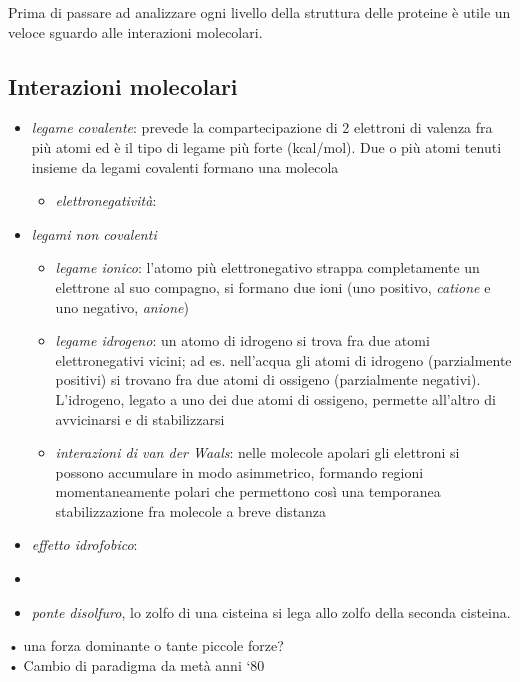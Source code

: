 Prima di passare ad analizzare ogni livello della struttura delle proteine è utile un veloce sguardo alle interazioni molecolari.

\subsection{Interazioni molecolari}

\begin{itemize}
	\item \textit{legame covalente}: prevede la compartecipazione di 2 elettroni di valenza fra più atomi ed è il tipo di legame più forte (kcal/mol). Due o più atomi tenuti insieme da legami covalenti formano una molecola
		\begin{itemize}
			\item \textit{elettronegatività}:
		\end{itemize}
		
	\item \textit{legami non covalenti}
		\begin{itemize}
			\item \textit{legame ionico}: l'atomo più elettronegativo strappa completamente un elettrone al suo compagno, si formano due ioni (uno positivo, \textit{catione} e uno negativo, \textit{anione})
			\item \textit{legame idrogeno}: un atomo di idrogeno si trova fra due atomi elettronegativi vicini; ad es. nell'acqua gli atomi di idrogeno (parzialmente positivi) si trovano fra due atomi di ossigeno (parzialmente negativi). L'idrogeno, legato a uno dei due atomi di ossigeno, permette all'altro di avvicinarsi e di stabilizzarsi
			\item \textit{interazioni di van der Waals}: nelle molecole apolari gli elettroni si possono accumulare in modo asimmetrico, formando regioni momentaneamente polari che permettono così una temporanea stabilizzazione fra molecole a breve distanza
		\end{itemize}
	\item \textit{effetto idrofobico}: 
	\item 
\end{itemize}
\begin{itemize}
	\item \textit{ponte disolfuro}, lo zolfo di una cisteina si lega allo zolfo della seconda cisteina.
\end{itemize}

• una forza dominante o tante piccole forze?\\
• Cambio di paradigma da metà anni ‘80\\

